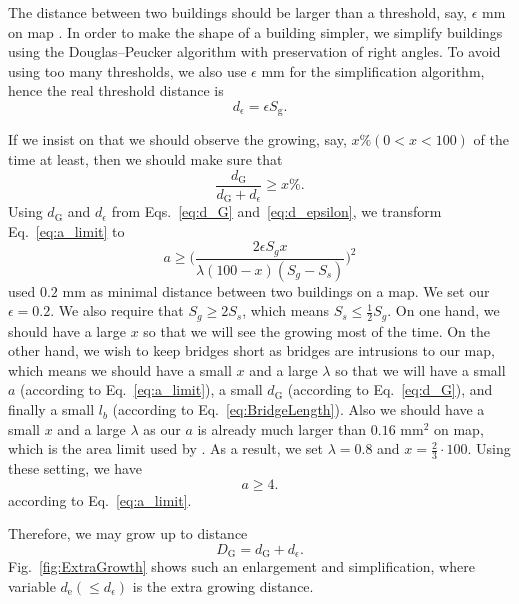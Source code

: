 \documentclass[graybox]{svmult}
\begin{document}
The distance between two buildings should be larger than a threshold, say, 
$\epsilon$ mm on map \parencite{Stoter2009}.
In order to make the shape of a building simpler, we simplify buildings 
using the Douglas--Peucker algorithm \parencite{Douglas1973} with preservation 
of right angles.
To avoid using too many thresholds, we also use $\epsilon$ mm for the 
simplification algorithm, hence the real threshold distance 
is
\begin{equation}
\label{eq:d_epsilon}
d_\epsilon= \epsilon  S_\mathrm{g}.
\end{equation}

If we insist on that we should observe 
the growing, say, $x \% (0<x<100)$ of the time at least, then we should make 
sure that
\begin{equation}
\label{eq:a_limit}
\frac{d_\mathrm{G}}{d_\mathrm{G}+d_\epsilon} \ge x \%.
\end{equation}
Using $d_\mathrm{G}$ and $d_\epsilon$ from Eqs.~\ref{eq:d_G} 
and~\ref{eq:d_epsilon}, we transform Eq.~\ref{eq:a_limit} to
\begin{equation}
a \ge \Big(\frac{2 \epsilon S_g x}{\lambda (100-x) (S_g-S_s)}\Big)^2
\end{equation}
\textcite{Stoter2009} used $0.2$ mm as minimal distance between two buildings 
on a map. We set our $\epsilon=0.2$.
We also require 
that $S_g \ge 2 S_s$, which means $S_s \le \frac{1}{2} S_g$.
On one hand, we should have a large $x$ so that we will see the 
growing most of the time.
On the other hand, we wish to keep bridges short as bridges are intrusions to 
our map, which means we should have a small $x$ and a large $\lambda$ so that 
we will have a small 
$a$ (according to Eq.~\ref{eq:a_limit}), a small $d_\mathrm{G}$ (according to 
Eq.~\ref{eq:d_G}), and finally a small $l_b$ (according to 
Eq.~\ref{eq:BridgeLength}). Also we should have a small $x$ and a large 
$\lambda$ as our $a$ is already much larger than $0.16$ mm$^2$ on 
map, which is the area limit used by \textcite{Stoter2009}. As a result, we set 
$\lambda=0.8$ and $x=\frac{2}{3} \cdot 100$.
Using these setting, we have
\begin{equation}
a \ge 4.
\end{equation}
according to Eq.~\ref{eq:a_limit}.




Therefore, we may grow up to distance 
\[
D_\mathrm{G} = d_\mathrm{G} + d_\epsilon.
\]
Fig.~\ref{fig:ExtraGrowth} shows such an enlargement and simplification, where  
variable $d_\mathrm{e} (\le d_\epsilon)$ is the extra growing distance.
\end{document}

